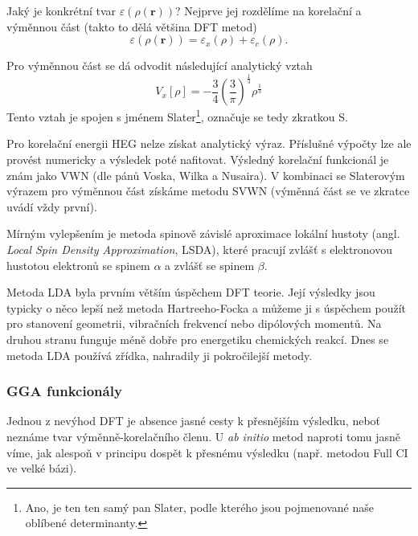 Jaký je konkrétní tvar $\varepsilon(\rho(\textbf{r}))$? Nejprve jej rozdělíme na korelační a výměnnou část (takto to dělá většina DFT metod)
\begin{equation}
\varepsilon(\rho(\textbf{r}))=\varepsilon_x(\rho)+\varepsilon_c(\rho) .
\end{equation}

\noindent Pro výměnnou část se dá odvodit následující analytický vztah
\begin{equation}
V_x[\rho]=-\frac{3}{4}\left(\frac{3}{\pi}\right)^{\frac{1}{3}}\rho^{\frac{1}{3}}
\end{equation}
Tento vztah je spojen s jménem Slater\footnote{Ano, je ten ten samý pan Slater, podle kterého jsou pojmenované naše oblíbené determinanty.}, označuje se tedy zkratkou S.

Pro korelační energii HEG nelze získat analytický výraz. Příslušné výpočty lze ale provést numericky a výsledek poté nafitovat. Výsledný korelační funkcionál je znám jako VWN (dle pánů Voska, Wilka a Nusaira). V kombinaci se Slaterovým výrazem pro výměnnou část získáme metodu SVWN (výměnná část se ve zkratce uvádí vždy první).

Mírným vylepšením je metoda spinově závislé aproximace lokální hustoty (angl. \textit{Local Spin Density Approximation}, LSDA), které pracují zvlášť s elektronovou hustotou elektronů se spinem $\alpha$ a zvlášť se spinem $\beta$.

Metoda LDA byla prvním větším úspěchem DFT teorie. Její výsledky jsou typicky o něco lepší než metoda Hartreeho-Focka a můžeme ji s úspěchem použít pro stanovení geometrii, vibračních frekvencí nebo dipólových momentů. Na druhou stranu funguje méně dobře pro energetiku chemických reakcí. Dnes se metoda LDA používá zřídka, nahradily ji pokročilejší metody.

\subsubsection{GGA funkcionály}
Jednou z nevýhod DFT je absence jasné cesty k přesnějším výsledku, neboť neznáme tvar výměnně-korelačního členu. U \textit{ab initio} metod naproti tomu jasně víme, jak alespoň v principu dospět k přesnému výsledku (např. metodou Full CI ve velké bázi).

